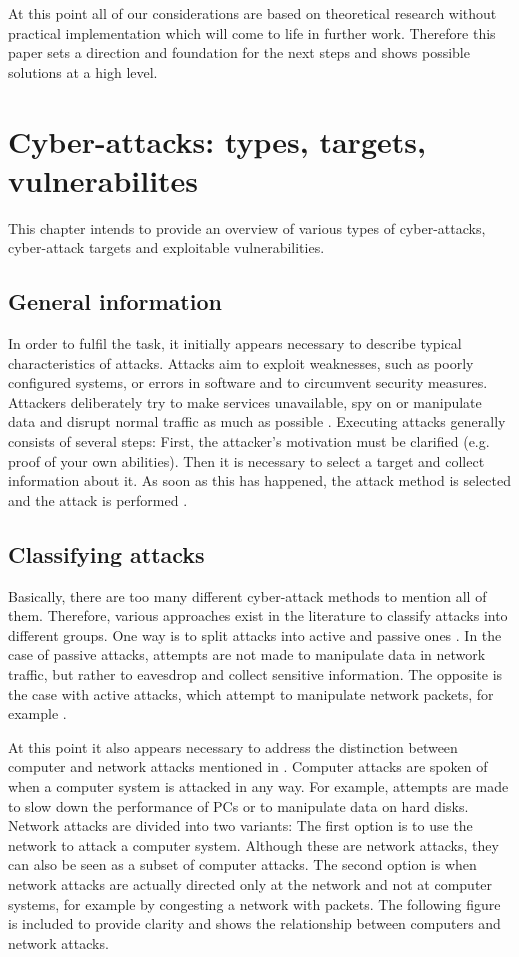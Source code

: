 \documentclass[conference]{IEEEtran}
\begin{document}
At this point all of our considerations are based on theoretical research without practical implementation which will come to life in further work. Therefore this paper sets a direction and foundation for the next steps and shows possible solutions at a high level.

\section{Cyber-attacks: types, targets, vulnerabilites}
\label{sec:cattv}

This chapter intends to provide an overview of various types of cyber-attacks, cyber-attack targets and exploitable vulnerabilities. 

\subsection{General information}
In order to fulfil the task, it initially appears necessary to describe typical characteristics of attacks. Attacks aim to exploit weaknesses, such as poorly configured systems, or errors in software and to circumvent security measures. Attackers deliberately try to make services unavailable, spy on or manipulate data and disrupt normal traffic as much as possible \cite{b1}. Executing attacks generally consists of several steps: First, the attacker's motivation must be clarified (e.g. proof of your own abilities). Then it is necessary to select a target and collect information about it. As soon as this has happened, the attack method is selected and the attack is performed \cite{b2}. 

\subsection{Classifying attacks}

\medskip Basically, there are too many different cyber-attack methods to mention all of them. Therefore, various approaches exist in the literature to classify attacks into different groups. One way is to split attacks into active and passive ones \cite{b3,b4}.  In the case of passive attacks, attempts are not made to manipulate data in network traffic, but rather to eavesdrop and collect sensitive information. The opposite is the case with active attacks, which attempt to manipulate network packets, for example \cite{b4}. 

At this point it also appears necessary to address the distinction between computer and network attacks mentioned in \cite{b2}. Computer attacks are spoken of when a computer system is attacked in any way. For example, attempts are made to slow down the performance of PCs or to manipulate data on hard disks. Network attacks are divided into two variants: The first option is to use the network to attack a computer system. Although these are network attacks, they can also be seen as a subset of computer attacks. The second option is when network attacks are actually directed only at the network and not at computer systems, for example by congesting a network with packets. The following figure is included to provide clarity and shows the relationship between computers and network attacks.
\end{document}

